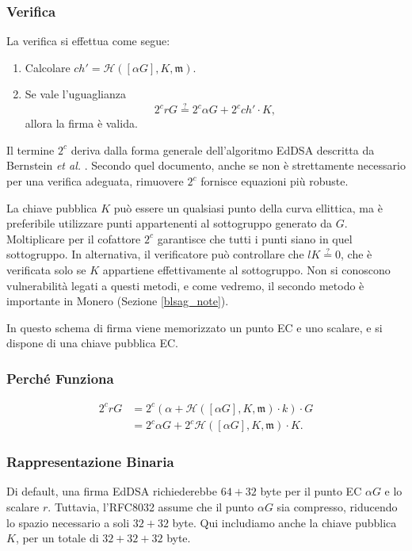 \subsubsection*{Verifica}
La verifica si effettua come segue:

\begin{enumerate}
	\item Calcolare \(ch' = \mathcal{H}([\alpha G], K, \mathfrak{m})\).
	
	\item Se vale l’uguaglianza 
	\[
	2^c r G \stackrel{?}{=} 2^c \alpha G + 2^c ch' \cdot K,
	\]
	allora la firma è valida.
\end{enumerate}

Il termine \(2^c\) deriva dalla forma generale dell’algoritmo EdDSA descritta da Bernstein {\em et al.} \cite{Bernstein2012}. Secondo quel documento, anche se non è strettamente necessario per una verifica adeguata, rimuovere \(2^c\) fornisce equazioni più robuste.

La chiave pubblica \(K\) può essere un qualsiasi punto della curva ellittica, ma è preferibile utilizzare punti appartenenti al sottogruppo generato da \(G\). Moltiplicare per il cofattore \(2^c\) garantisce che tutti i punti siano in quel sottogruppo. In alternativa, il verificatore può controllare che \(l K \stackrel{?}{=} 0\), che è verificata solo se \(K\) appartiene effettivamente al sottogruppo. Non si conoscono vulnerabilità legati a questi metodi, e come vedremo, il secondo metodo è importante in Monero (Sezione \ref{blsag_note}).

In questo schema di firma viene memorizzato un punto EC e uno scalare, e si dispone di una chiave pubblica EC.

\subsubsection*{Perché Funziona}
\begin{align*}
2^c r G &= 2^c (\alpha + \mathcal{H}([\alpha G], K, \mathfrak{m}) \cdot k) \cdot G \\
&= 2^c \alpha G + 2^c \mathcal{H}([\alpha G], K, \mathfrak{m}) \cdot K.
\end{align*}

\subsubsection*{Rappresentazione Binaria}

Di default, una firma EdDSA richiederebbe \(64 + 32\) byte per il punto EC \(\alpha G\) e lo scalare \(r\). Tuttavia, l’RFC8032 assume che il punto \(\alpha G\) sia compresso, riducendo lo spazio necessario a soli \(32 + 32\) byte. Qui includiamo anche la chiave pubblica \(K\), per un totale di \(32 + 32 + 32\) byte.



